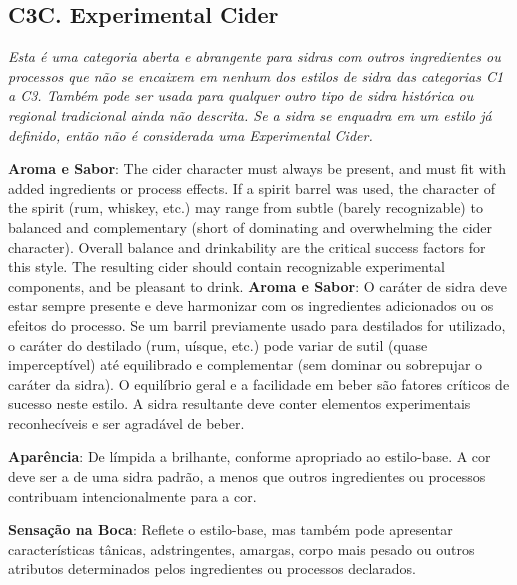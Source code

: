\subsection*{C3C. Experimental Cider}

\textit{Esta é uma categoria aberta e abrangente para sidras com outros ingredientes ou processos que não se encaixem em nenhum dos estilos de sidra das categorias C1 a C3. Também pode ser usada para qualquer outro tipo de sidra histórica ou regional tradicional ainda não descrita. Se a sidra se enquadra em um estilo já definido, então não é considerada uma Experimental Cider.}

\textbf{Aroma e Sabor}: The cider character must always be present, and must fit with added ingredients or process effects. If a spirit barrel was used, the character of the spirit (rum, whiskey, etc.) may range from subtle (barely recognizable) to balanced and complementary (short of dominating and overwhelming the cider character). Overall balance and drinkability are the critical success factors for this style. The resulting cider should contain recognizable experimental components, and be pleasant to drink.
\textbf{Aroma e Sabor}: O caráter de sidra deve estar sempre presente e deve harmonizar com os ingredientes adicionados ou os efeitos do processo. Se um barril previamente usado para destilados for utilizado, o caráter do destilado (rum, uísque, etc.) pode variar de sutil (quase imperceptível) até equilibrado e complementar (sem dominar ou sobrepujar o caráter da sidra). O equilíbrio geral e a facilidade em beber são fatores críticos de sucesso neste estilo. A sidra resultante deve conter elementos experimentais reconhecíveis e ser agradável de beber.

\textbf{Aparência}: De límpida a brilhante, conforme apropriado ao estilo-base. A cor deve ser a de uma sidra padrão, a menos que outros ingredientes ou processos contribuam intencionalmente para a cor.

\textbf{Sensação na Boca}: Reflete o estilo-base, mas também pode apresentar características tânicas, adstringentes, amargas, corpo mais pesado ou outros atributos determinados pelos ingredientes ou processos declarados.

